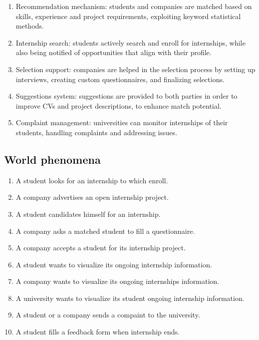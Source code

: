\begin{enumerate}[label=\textbf{F\arabic* -}]
    \item Recommendation mechanism: students and companies are matched based on skills, experience and project requirements, exploiting keyword statistical methods.
    \item Internship search: students actively search and enroll for internships, while also being notified of opportunities that align with their profile.
    \item Selection support: companies are helped in the selection process by setting up interviews, creating custom questionnaires, and finalizing selections.
    \item Suggestions system: suggestions are provided to both parties in order to improve CVs and project descriptions, to enhance match potential.
    \item Complaint management: universities can monitor internships of their students, handling complaints and addressing issues.
\end{enumerate}

\subsection{World phenomena}

\begin{enumerate}[label=\textbf{WP\arabic* -}]
    \item A student looks for an internship to which enroll.
    \item A company advertises an open internship project.
    \item A student candidates himself for an internship.
    \item A company asks a matched student to fill a questionnaire.
    \item A company accepts a student for its internship project.
    \item A student wants to visualize its ongoing internship information.
    \item A company wants to visualize its ongoing internships information.
    \item A university wants to visualize its student ongoing internship information.
    \item A student or a company sends a compaint to the university.
    \item A student fills a feedback form when internship ends.
\end{enumerate}

